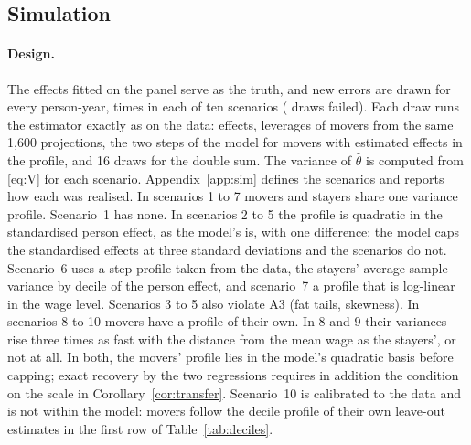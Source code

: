 \subsection{Simulation}\label{sec:sim}

\paragraph{Design.} The effects fitted on the panel serve as the truth, and new errors are drawn for every
person-year,  times in each of ten scenarios ( draws failed). Each draw runs the
estimator exactly as on the data: effects, leverages of movers from the same 1{,}600 projections, the two steps
of the model for movers with estimated effects in the profile, and 16 draws for the double sum. The variance
of $\hat\theta$ is computed from \eqref{eq:V} for each scenario. Appendix~\ref{app:sim} defines the scenarios and
reports how each was realised. In scenarios 1 to 7 movers and stayers share one variance profile. Scenario~1
has none. In scenarios 2 to 5 the profile is quadratic in the standardised person effect, as the model's is,
with one difference: the model caps the standardised effects at three standard deviations and the scenarios do
not. Scenario~6 uses a step profile taken from the data, the stayers' average sample variance by decile of the
person effect, and scenario~7 a profile that is log-linear in the wage level. Scenarios 3 to 5 also violate A3
(fat tails, skewness). In scenarios 8 to 10 movers have a profile of their own. In 8 and 9 their variances rise
three times as fast with the distance from the mean wage as the stayers', or not at all. In both, the movers'
profile lies in the model's quadratic basis before capping; exact recovery by the two regressions requires in
addition the condition on the scale in Corollary~\ref{cor:transfer}. Scenario~10 is calibrated to the data and is
not within the model: movers follow the decile profile of their own leave-out estimates in the first row of
Table~\ref{tab:deciles}.

